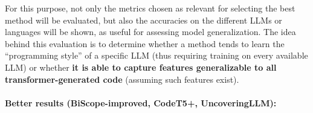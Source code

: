 For this purpose, not only the metrics chosen as relevant for selecting the 
best method will be evaluated, but also the accuracies on the different LLMs 
or languages will be shown, as useful for assessing model generalization. 
The idea behind this evaluation is to determine whether a method tends to 
learn the “programming style” of a specific LLM (thus requiring training 
on every available LLM) or whether \textbf{it is able to capture features 
generalizable to all transformer-generated code} (assuming such 
features exist).





\paragraph{Better results (BiScope-improved, CodeT5+, UncoveringLLM):}

